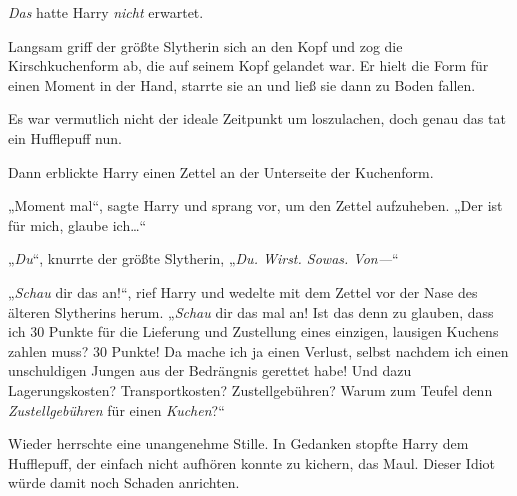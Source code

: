 \emph{Das} hatte Harry \emph{nicht} erwartet.

Langsam griff der größte Slytherin sich an den Kopf und zog die Kirschkuchenform ab, die auf seinem Kopf gelandet war. Er hielt die Form für einen Moment in der Hand, starrte sie an und ließ sie dann zu Boden fallen.

Es war vermutlich nicht der ideale Zeitpunkt um loszulachen, doch genau das tat ein Hufflepuff nun.

Dann erblickte Harry einen Zettel an der Unterseite der Kuchenform.

„Moment mal“, sagte Harry und sprang vor, um den Zettel aufzuheben. „Der ist für mich, glaube ich…“

„\emph{Du}“, knurrte der größte Slytherin, „\emph{Du. Wirst. Sowas. Von—}“

„\emph{Schau} dir das an!“, rief Harry und wedelte mit dem Zettel vor der Nase des älteren Slytherins herum. „\emph{Schau} dir das mal an! Ist das denn zu glauben, dass ich 30 Punkte für die Lieferung und Zustellung eines einzigen, lausigen Kuchens zahlen muss? 30 Punkte! Da mache ich ja einen Verlust, selbst nachdem ich einen unschuldigen Jungen aus der Bedrängnis gerettet habe! Und dazu Lagerungskosten? Transportkosten? Zustellgebühren? Warum zum Teufel denn \emph{Zustellgebühren} für einen \emph{Kuchen}?“

Wieder herrschte eine unangenehme Stille. In Gedanken stopfte Harry dem Hufflepuff, der einfach nicht aufhören konnte zu kichern, das Maul. Dieser Idiot würde damit noch Schaden anrichten.

